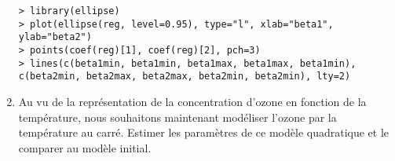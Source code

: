 \documentclass{td_um}
\providecommand{\1}{\mathds{1}}
\begin{document}
\begin{enumerate}
    \begin{verbatim}
> library(ellipse)
> plot(ellipse(reg, level=0.95), type="l", xlab="beta1", ylab="beta2")
> points(coef(reg)[1], coef(reg)[2], pch=3)
> lines(c(beta1min, beta1min, beta1max, beta1max, beta1min), c(beta2min, beta2max, beta2max, beta2min, beta2min), lty=2)
\end{verbatim}
\item Au vu de la représentation de la concentration d'ozone en fonction de la température, nous souhaitons maintenant modéliser l'ozone par la température au carré. Estimer les paramètres de ce modèle quadratique et le comparer au modèle initial.
\end{enumerate}

\end{document}
